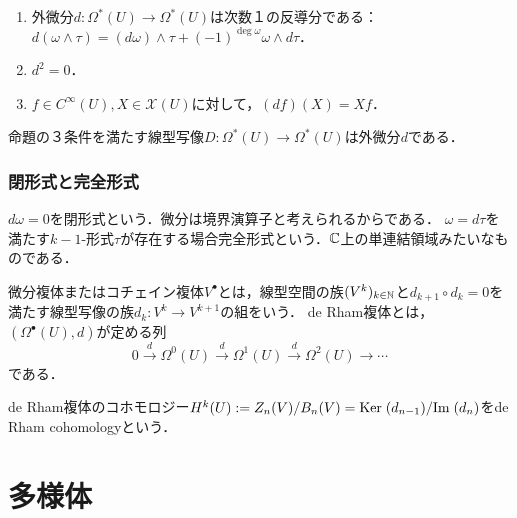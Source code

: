 \documentclass[uplatex,dvipdfmx]{jsreport}
\begin{document}
\begin{proposition}[外微分の性質]\mbox{}
    \begin{enumerate}
        \item 外微分$d:\Omega^*(U)\to\Omega^*(U)$は次数１の反導分である：$d(\omega\wedge\tau)=(d\omega)\wedge\tau+(-1)^{\deg\omega}\omega\wedge d\tau$．
        \item $d^2=0$．
        \item $f\in C^\infty(U),X\in\mathcal{X}(U)$に対して，$(df)(X)=Xf$．
    \end{enumerate}
\end{proposition}

\begin{proposition}[外微分の特徴付け]
    命題の３条件を満たす線型写像$D:\Omega^*(U)\to\Omega^*(U)$は外微分$d$である．
\end{proposition}

\subsection{閉形式と完全形式}

\begin{tcolorbox}[colframe=ForestGreen, colback=ForestGreen!10!white,breakable,colbacktitle=ForestGreen!40!white,coltitle=black,fonttitle=\bfseries\sffamily,
title=]
    $d\omega=0$を閉形式という．微分は境界演算子と考えられるからである．
    $\omega=d\tau$を満たす$k-1$-形式$\tau$が存在する場合完全形式という．$\mathbb{C}$上の単連結領域みたいなものである．
\end{tcolorbox}

\begin{definition}
    微分複体またはコチェイン複体$V^\bullet$とは，線型空間の族$(V^k)_{k\in\mathbb{N}}$と$d_{k+1}\circ d_k=0$を満たす線型写像の族$d_k:V^k\to V^{k+1}$の組をいう．
    de Rham複体とは，$(\Omega^\bullet(U),d)$が定める列
    \[0\xrightarrow{d}\Omega^0(U)\xrightarrow{d}\Omega^1(U)\xrightarrow{d}\Omega^2(U)\to\cdots\]
    である．
\end{definition}

\begin{definition}
    de Rham複体のコホモロジー$H^k(U):=Z_n(V)/B_n(V)=\mathrm{Ker}\;(d_{n-1})/\mathrm{Im}\;(d_n)$をde Rham cohomologyという．
\end{definition}

\chapter{多様体}
\end{document}
